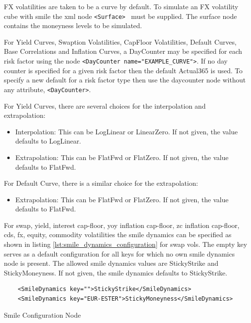 \documentclass[12pt, a4paper]{article}
\begin{document}
{FX volatilities are taken to be a curve by default. To simulate an FX volatility cube with smile the xml node {\tt <Surface> } must be supplied. The surface node contains the moneyness levels to be simulated.

For Yield Curves, Swaption Volatilities, CapFloor Volatilities, Default Curves, Base Correlations and Inflation Curves, a DayCounter may be specified for each risk factor using the node {\tt <DayCounter name="EXAMPLE\_CURVE">}.  
If no day counter is specified for a given risk factor then the default Actual365 is used. To specify a new default for a risk factor type then use the daycounter node without any attribute,  {\tt <DayCounter>}.

For Yield Curves, there are several choices for the interpolation and extrapolation:
\begin{itemize}
\item Interpolation: This can be LogLinear or LinearZero. If not given, the value defaults to LogLinear.
\item Extrapolation: This can be FlatFwd or FlatZero. If not given, the value defaults to FlatFwd.
\end{itemize}

For Default Curve, there is a similar choice for the extrapolation:
\begin{itemize}
\item Extrapolation: This can be FlatFwd or FlatZero. If not given, the value defaults to FlatFwd.
\end{itemize}

For swap, yield, interest cap-floor, yoy inflation cap-floor, zc inflation cap-floor, cds, fx, equity, commodity
volatilities the smile dynamics can be specified as shown in listing \ref{lst:smile_dynamics_configuration} for swap
vols. The empty key serves as a default configuration for all keys for which no own smile dynamics node is present. The
allowed smile dynamics values are StickyStrike and StickyMoneyness. If not given, the smile dynamics defaults to
StickyStrike.

\begin{listing}
  \begin{verbatim}
    <SmileDynamics key="">StickyStrike</SmileDynamics>
    <SmileDynamics key="EUR-ESTER">StickyMoneyness</SmileDynamics>
  \end{verbatim}
\caption{Smile Configuration Node}
\label{lst:smile_dynamics_configuration}
\end{listing}

}
\end{document}

